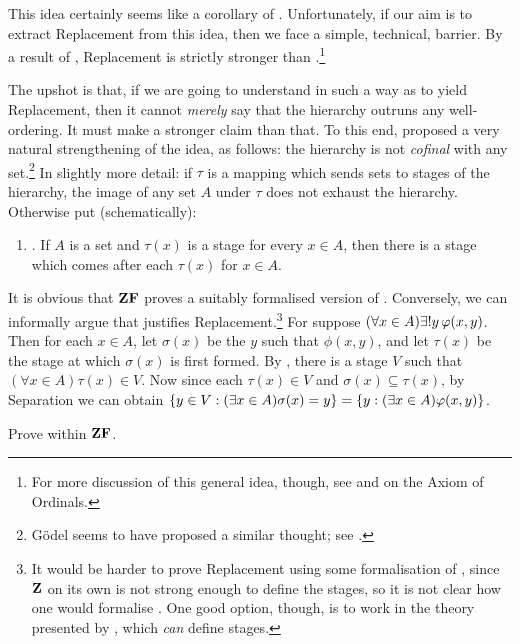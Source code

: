 \documentclass[../../../include/open-logic-section]{subfiles}
\begin{document}
This idea certainly seems like a corollary of \stagesinex.
Unfortunately, if our aim is to extract Replacement from this idea,
then we face a simple, technical, barrier. By a result of
\citet{Montague1961}, Replacement is strictly stronger than
.\footnote{For more
discussion of this general idea, though, see
\citet[\S13.2]{Potter2004} and \citet{IncurvatiThesis} on the Axiom of
Ordinals.}

The upshot is that, if we are going to understand \stagesinex{} in
such a way as to yield Replacement, then it cannot \emph{merely} say
that the hierarchy outruns any well-ordering. It must make a stronger
claim than that. To this end, \cite{Shoenfield:AST} proposed a very
natural strengthening of the idea, as follows: the hierarchy is not
\emph{cofinal} with any set.\footnote{G\"odel seems to have proposed a
similar thought; see \cite[p.~223]{Potter2004}.} In slightly more detail:
if $\tau$ is a mapping which sends sets to stages of the hierarchy,
the image of any set $A$ under $\tau$ does not exhaust the hierarchy.
Otherwise put (schematically): 
\begin{enumerate}
	\item[] \stagescofin. If $A$ is a set and $\tau(x)$ is a stage for
	every $x \in A$, then there is a stage which comes after each
	$\tau(x)$ for $x \in A$.
\end{enumerate}
It is obvious that $\mathbf{ZF}$ proves a suitably formalised version of
\stagescofin. Conversely, we can informally argue that \stagescofin{}
justifies Replacement.\footnote{It would be harder to prove
Replacement using some formalisation of \stagescofin, since $\mathbf{Z}$ on
its own is not strong enough to define the stages, so it is not clear
how one would formalise \stagescofin. One good option, though, is to
work in the theory presented by \cite{Potter2004}, which \emph{can}
define stages.} For suppose $(\forall x \in A)\lexists![y][\phi(x,y)]$. Then for each $x \in A$, let $\sigma(x)$ be the $y$ such
that $\phi(x,y)$, and let $\tau(x)$ be the stage at which $\sigma(x)$
is first formed. By \stagescofin, there is a stage $V$ such that
$(\forall x \in A)\tau(x)\in V$. Now since each $\tau(x) \in V$ and
$\sigma(x) \subseteq \tau(x)$, by Separation we can obtain $\{ y
\in V : (\exists x \in A)\sigma(x) = y \} = \{ y : (\exists x \in
A)\varphi(x,y) \}$.

\begin{prob}
Prove \stagescofin{} within $\mathbf{ZF}$.
\end{prob}
\end{document}
